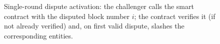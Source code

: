 \begin{figure}[h!]
\centering


\caption{Single-round dispute activation: the challenger calls the smart contract with the disputed block number $i$; the contract verifies it (if not already verified) and, on first valid dispute, slashes the corresponding entities.}
\label{protocol:dispute_resolution}
\end{figure}
